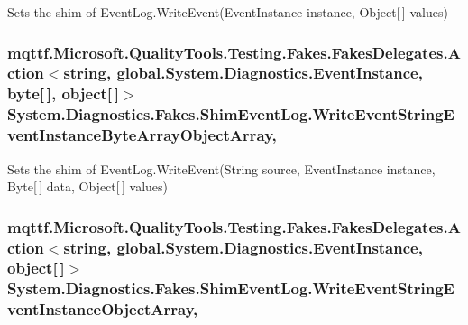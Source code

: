 Sets the shim of Event\-Log.\-Write\-Event(\-Event\-Instance instance, Object\mbox{[}$\,$\mbox{]} values)

\hypertarget{class_system_1_1_diagnostics_1_1_fakes_1_1_shim_event_log_af4b51bdd657289bc2ec2ed8a95cf446a}{
\subsubsection[{Write\-Event\-String\-Event\-Instance\-Byte\-Array\-Object\-Array}]{\setlength{\rightskip}{0pt plus 5cm}mqttf.\-Microsoft.\-Quality\-Tools.\-Testing.\-Fakes.\-Fakes\-Delegates.\-Action$<$string, global.\-System.\-Diagnostics.\-Event\-Instance, byte\mbox{[}$\,$\mbox{]}, object\mbox{[}$\,$\mbox{]}$>$ System.\-Diagnostics.\-Fakes.\-Shim\-Event\-Log.\-Write\-Event\-String\-Event\-Instance\-Byte\-Array\-Object\-Array\hspace{0.3cm}{\ttfamily [static]}, {\ttfamily [set]}}}\label{class_system_1_1_diagnostics_1_1_fakes_1_1_shim_event_log_af4b51bdd657289bc2ec2ed8a95cf446a}


Sets the shim of Event\-Log.\-Write\-Event(\-String source, Event\-Instance instance, Byte\mbox{[}$\,$\mbox{]} data, Object\mbox{[}$\,$\mbox{]} values)

\hypertarget{class_system_1_1_diagnostics_1_1_fakes_1_1_shim_event_log_aceaacc0e3f8d06243fa1b3867adac881}{
\subsubsection[{Write\-Event\-String\-Event\-Instance\-Object\-Array}]{\setlength{\rightskip}{0pt plus 5cm}mqttf.\-Microsoft.\-Quality\-Tools.\-Testing.\-Fakes.\-Fakes\-Delegates.\-Action$<$string, global.\-System.\-Diagnostics.\-Event\-Instance, object\mbox{[}$\,$\mbox{]}$>$ System.\-Diagnostics.\-Fakes.\-Shim\-Event\-Log.\-Write\-Event\-String\-Event\-Instance\-Object\-Array\hspace{0.3cm}{\ttfamily [static]}, {\ttfamily [set]}}}\label{class_system_1_1_diagnostics_1_1_fakes_1_1_shim_event_log_aceaacc0e3f8d06243fa1b3867adac881}


